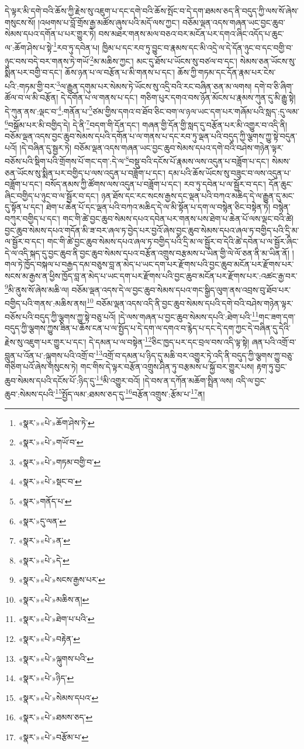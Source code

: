 དེ་ལྟར་མི་དགེ་བའི་ཆོས་ཀྱི་རྗེས་སུ་འཇུག་པ་དང་དགེ་བའི་ཆོས་སྤོང་བ་དེ་དག་ཐམས་ཅད་ནི་བདུད་ཀྱི་ལས་སོ་ཞེས་གསུངས་སོ། །འཕགས་པ་བློ་གྲོས་རྒྱ་མཚོས་ཞུས་པའི་མདོ་ལས་ཀྱང་། བཅོམ་ལྡན་འདས་གཞན་ཡང་བྱང་ཆུབ་སེམས་དཔའ་དགོན་པ་པར་གྱུར་ཏེ། བས་མཐར་གནས་མལ་བཅའ་བར་མངོན་པར་དགའ་ཞིང་འདོད་པ་ཆུང་ལ་:ཆོག་ཤེས་པ་སྟེ་\footnote{«སྣར་»«པེ་»ཆོག་ཤེས་ཏེ་}རབ་ཏུ་དབེན་པ། ཁྱིམ་པ་དང་རབ་ཏུ་བྱུང་བ་རྣམས་དང་མི་འདྲེ་ལ་དེ་དོན་ཉུང་བ་དང་བགྱི་བ་ཉུང་བས་བདེ་བར་གནས་ཏེ་གཡོ་\footnote{«སྣར་»«པེ་»གཡོ་བ་}མ་མཆིས་ཀྱང་། མང་དུ་ཐོས་པ་ཡོངས་སུ་བཙལ་བ་དང་། སེམས་ཅན་ཡོངས་སུ་སྨིན་པར་བགྱི་བ་དང་། ཆོས་ཉན་པ་ལ་བརྩོན་པ་མི་གནས་པ་དང་། ཆོས་ཀྱི་གཏམ་དང་དོན་རྣམ་པར་ངེས་པའི་:གཏམ་གྱི་བར་\footnote{«སྣར་»«པེ་»གཏམ་བགྱི་བ་}ལ་རྒྱུན་དགུམ་པར་སེམས་ཏེ་ཡོངས་སུ་འདྲི་བའི་རང་བཞིན་ཅན་མ་ལགས། དགེ་བ་ཅི་ཞིག་ཚོལ་བ་ལ་མི་བརྩོན། དེ་དགོན་པ་ལ་གནས་པ་དང་། གཅིག་པུར་དགའ་བས་ཉོན་མོངས་པ་རྣམས་ཀུན་དུ་མི་རྒྱུ་སྟེ། དེ་ཀུན་ནས་:ལྡང་བ་\footnote{«སྣར་»«པེ་»སྡང་བ་}:གནོན་པ་\footnote{«སྣར་»གནོད་པ་}ཙམ་གྱིས་དགའ་བ་ཐོབ་ཅིང་བག་ལ་ཉལ་ཡང་དག་པར་གཞོམ་པའི་སླད་:དུ་ལམ་\footnote{«སྣར་»དུ་ལན་}བསྒོམ་པར་མི་བགྱིད་དེ། དེ་ནི་\footnote{«སྣར་»«པེ་»ན་}བདག་གི་དོན་དང་། གཞན་གྱི་དོན་གྱི་སླད་དུ་བརྩོན་པར་མི་འགྱུར་བ་འདི་ནི། བཅོམ་ལྡན་འདས་བྱང་ཆུབ་སེམས་དཔའི་དགོན་པ་ལ་གནས་པ་དང་རབ་ཏུ་ལྡན་པའི་བདུད་ཀྱི་ལྕགས་ཀྱུ་སྟེ་བདུན་པའོ། །དེ་བཞིན་དུ་སྦྱར་ཏེ། བཅོམ་ལྡན་འདས་གཞན་ཡང་བྱང་ཆུབ་སེམས་དཔའ་དགེ་བའི་བཤེས་གཉེན་ལྟར་བཅོས་པའི་སྡིག་པའི་གྲོགས་པོ་གང་དག་:དེ་ལ་\footnote{«སྣར་»«པེ་»དེ་}བསྡུ་བའི་དངོས་པོ་རྣམས་ལས་འདུན་པ་བཟློག་པ་དང་། སེམས་ཅན་ཡོངས་སུ་སྨིན་པར་བགྱིད་པ་ལས་འདུན་པ་བཟློག་པ་དང་། དམ་པའི་ཆོས་ཡོངས་སུ་བཟུང་བ་ལས་འདུན་པ་བཟློག་པ་དང་། བསོད་ནམས་ཀྱི་ཚོགས་ལས་འདུན་པ་བཟློག་པ་དང་། རབ་ཏུ་དབེན་པ་ལ་སྦྱོར་བ་དང་། དོན་ཆུང་ཞིང་བགྱིད་པ་ཉུང་བ་ལ་སྦྱོར་བ་དང་། ཉན་ཐོས་དང་རང་སངས་རྒྱས་དང་ལྡན་པའི་བཀའ་མཆིད་དེ་ལ་རྒྱུན་དུ་མང་དུ་སྟོན་པ་དང་། ཐེག་པ་ཆེན་པོ་དང་ལྡན་པའི་བཀའ་མཆིད་དེ་ལ་མི་སྟོན་པ་དག་ལ་བསྙེན་ཅིང་བསྟེན་ཏེ། བསྙེན་བཀུར་བགྱིད་པ་དང་། གང་གི་ཚེ་བྱང་ཆུབ་སེམས་དཔའ་དབེན་པར་གནས་པས་ཐེག་པ་ཆེན་པོ་ལས་ལྡང་བའི་ཚེ། བྱང་ཆུབ་སེམས་དཔའ་གདོན་མི་ཟ་བར་ཞལ་ཏ་བྱེད་པར་བྱའོ་ཞེས་བྱང་ཆུབ་སེམས་དཔའ་ཞལ་ཏ་བགྱིད་པའི་དྲི་མ་ལ་སྦྱོར་བ་དང་། གང་གི་ཚེ་བྱང་ཆུབ་སེམས་དཔའ་ཞལ་ཏ་བགྱིད་པའི་དྲི་མ་ལ་སྦྱོར་བ་དེའི་ཚེ་དབེན་པ་ལ་སྦྱོར་ཞིང་དེ་ལ་འདི་སྐད་དུ་བྱང་ཆུབ་ནི་བྱང་ཆུབ་སེམས་དཔའ་བརྩོན་འགྲུས་བརྩམས་པ་ཡིན་གྱི་ལེ་ལོ་ཅན་ནི་མ་ཡིན་ནོ། །གལ་ཏེ་ཁྱོད་བསྐལ་པ་བརྒྱད་དམ་བཅུས་བླ་ན་མེད་པ་ཡང་དག་པར་རྫོགས་པའི་བྱང་ཆུབ་མངོན་པར་རྫོགས་པར་སངས་མ་རྒྱས་ན་ཕྱིས་ཁྱོད་བླ་ན་མེད་པ་ཡང་དག་པར་རྫོགས་པའི་བྱང་ཆུབ་མངོན་པར་རྫོགས་པར་:འཚང་རྒྱ་བར་\footnote{«སྣར་»«པེ་»སངས་རྒྱས་པར་}མི་ནུས་སོ་ཞེས་མཆི་ལ། བཅོམ་ལྡན་འདས་དེ་ལ་བྱང་ཆུབ་སེམས་དཔའ་གང་སྒྱིད་ལུག་ནས་འབྲས་བུ་ཐོབ་པར་བགྱིད་པའི་གནས་:མཆིས་ནས།\footnote{«སྣར་»«པེ་»མཆིས་ན།} བཅོམ་ལྡན་འདས་འདི་ནི་བྱང་ཆུབ་སེམས་དཔའི་དགེ་བའི་བཤེས་གཉེན་ལྟར་བཅོས་པའི་བདུད་ཀྱི་ལྕགས་ཀྱུ་སྟེ་བཅུ་པའོ། །དེ་ལས་གཞན་པ་བྱང་ཆུབ་སེམས་དཔའི་:ཐེག་པའི་\footnote{«སྣར་»«པེ་»ཐེག་པ་པའི་}གང་ཟག་དག་བདུད་ཀྱི་ལྕགས་ཀྱུས་ཟིན་པ་ཆོས་ངན་པ་ལ་སྤྱོད་པ་དེ་དག་ལ་དགའ་བ་རྙེད་པ་དང་དེ་དག་ཀྱང་དེ་བཞིན་དུ་དེའི་རྗེས་སུ་འཇུག་པར་གྱུར་པ་དང་། དེ་དམན་པ་ལ་བསྟེན་\footnote{«སྣར་»«པེ་»བརྟེན་}ཅིང་ཁྱད་པར་དང་བྲལ་བས་འདི་ལྟ་སྟེ། ཞན་པའི་འགྲོ་བ་བླུན་པ་འོན་པ་:ལྐུགས་པའི་འགྲོ་བ་\footnote{«སྣར་»«པེ་»ལྐུགས་པའི་}འགྲོ་བ་དམན་པ་ཉིད་དུ་མཆི་བར་འགྱུར་ཏེ་འདི་ནི་བདུད་ཀྱི་ལྕགས་ཀྱུ་བཅུ་གཅིག་པའོ་ཞེས་གསུངས་ཏེ། གང་གིས་དེ་ལྟར་བརྩོན་འགྲུས་ཤིན་ཏུ་བརྩམས་པ་སྐྱོ་བར་གྱུར་པས། རྟག་ཏུ་བྱང་ཆུབ་སེམས་དཔའི་དངོས་པོ་:ཉིད་དུ་\footnote{«སྣར་»«པེ་»ཉིད་}མི་འགྱུར་བའོ། །དེ་བས་ན་དཀོན་མཆོག་སྤྲིན་ལས། འདི་ལ་བྱང་ཆུབ་:སེམས་དཔའི་\footnote{«སྣར་»«པེ་»སེམས་དཔའ་}སྤྱོད་ལམ་:ཐམས་ཅད་དུ་\footnote{«སྣར་»«པེ་»ཐམས་ཅད་}བརྩོན་འགྲུས་:རྩོམ་པ་\footnote{«སྣར་»«པེ་»བརྩོམ་པ་}ན། 